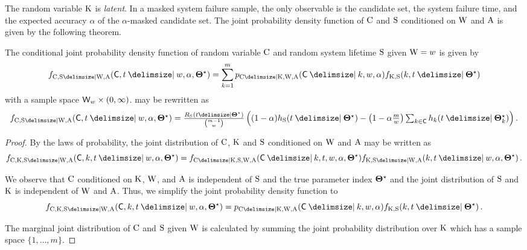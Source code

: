 \documentclass[
    11pt,
    extrafontsizes,
    article,
    oldfontcommands,
    final,
    oneside,
    openany,
    hidelinks]{memoir}
\begin{document}
The random variable $\mathrm{K}$ is \emph{latent}.
In a masked system failure sample, the only observable is the candidate set, the system failure time, and the expected accuracy $\alpha$ of the $\alpha$-masked candidate set.
The joint probability density function of $\mathrm{C}$ and $\mathrm{S}$ conditioned on $\mathrm{W}$ and $\mathrm{A}$ is given by the following theorem.
\begin{theorem}
The conditional joint probability density function of random variable $\mathrm{C}$ and random system lifetime $\mathrm{S}$ given $\mathrm{W} = w$ is given by
\begin{equation}
\label{eq:joint_alpha}
\pdf_{\rvcand,\sv \Given \RV{W}, \RV{A}}(\cand,t \Given w, \alpha, \tparam\sysparam) =
	\sum_{k=1}^{m} \pmf_{\rvcand \Given \RV{K}, \RV{W}, \RV{A}}(\cand \Given k, w, \alpha) \pdf_{\RV{K},\sv}(k,t \Given \tparam\sysparam)
\end{equation}
with a sample space $\candsw{w} \times (0,\infty)$.
 may be rewritten as
\begin{equation}
\label{eq:joint_alpha_2}
\mathsmaller{\pdf_{\rvcand,\sv \Given \RV{W}, \RV{A}}(\cand,t \Given w, \alpha, \tparam\sysparam) =
\frac{\srv_{\sv}(t \Given \tparam\sysparam)}{\binom{m-1}{w}}
\left(
	(1-\alpha) \haz_{\sv}(t \Given \tparam\sysparam) - \left(1-\alpha \frac{m}{w}\right) \sum_{k \in \cand} \haz_k(t \Given \tparam\sysparam_k)
\right)}\,.
\end{equation}
\end{theorem}
\begin{proof}
By the laws of probability, the joint distribution of $\mathrm{C}$, $\mathrm{K}$ and $\mathrm{S}$ conditioned on $\mathrm{W}$ and $\mathrm{A}$ may be written as
\begin{equation}
	\pdf_{\rvcand,\RV{K},\sv \Given \RV{W}, \RV{A}}(\cand,k,t \Given w, \alpha, \tparam\sysparam) = \pdf_{\rvcand \Given \RV{K}, \sv, \RV{W}, \RV{A}}(\cand \Given k, t, w, \alpha, \tparam\sysparam) \pdf_{\RV{K},\sv \Given \RV{W}, \RV{A}}(k,t \Given w, \alpha, \tparam\sysparam)\,.
\end{equation}

We observe that $\mathrm{C}$ conditioned on $\mathrm{K}$, $\mathrm{W}$, and $\mathrm{A}$ is independent of $\mathrm{S}$ and the true parameter index ${\boldsymbol{\Theta}}^{\star}$ and the joint distribution of $\mathrm{S}$ and $\mathrm{K}$ is independent of $\mathrm{W}$ and $\mathrm{A}$.
Thus, we simplify the joint probability density function to
\begin{equation}
\pdf_{\rvcand,\RV{K},\sv \Given \RV{W}, \RV{A}}(\cand,k,t \Given w, \alpha, \tparam\sysparam) = \pmf_{\rvcand \Given \RV{K}, \RV{W}, \RV{A}}(\cand \Given k, w, \alpha) \pdf_{\RV{K},\sv}(k,t \Given \tparam\sysparam)\,.
\end{equation}

The marginal joint distribution of $\mathrm{C}$ and $\mathrm{S}$ given $\mathrm{W}$ is calculated by summing the joint probability distribution over $\mathrm{K}$ which has a sample space $\{1,\ldots,m\}$.
\end{proof}
\end{document}
